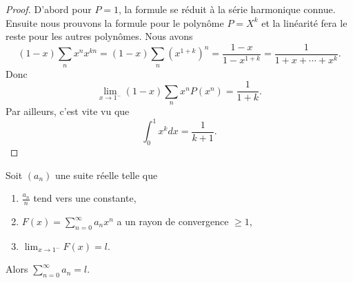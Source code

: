 \begin{proof}
	D'abord pour \( P=1\), la formule se réduit à la série harmonique connue. Ensuite nous prouvons la formule pour le polynôme \( P=X^k\) et la linéarité fera le reste pour les autres polynômes. Nous avons
	\begin{equation}
		(1-x)\sum_nx^nx^{kn}=(1-x)\sum_n(x^{1+k})^n=\frac{ 1-x }{ 1-x^{1+k} }=\frac{1}{ 1+x+\cdots+x^k }.
	\end{equation}
	Donc
	\begin{equation}
		\lim_{x\to 1^-} (1-x)\sum_nx^nP(x^n)=\frac{1}{ 1+k }.
	\end{equation}
	Par ailleurs, c'est vite vu que
	\begin{equation}
		\int_0^1 x^kdx=\frac{1}{ k+1 }.
	\end{equation}
\end{proof}

\begin{theorem}      \label{ThoPdDxgP}
	Soit \( (a_n)\) une suite réelle telle que
	\begin{enumerate}
		\item
		      \( \frac{ a_n }{ n }\) tend vers une constante,
		\item
		      \( F(x)=\sum_{n=0}^{\infty}a_nx^n\) a un rayon de convergence \( \geq 1\),
		\item
		      \( \lim_{x\to 1^-} F(x)=l\).
	\end{enumerate}
	Alors \( \sum_{n=0}^{\infty}a_n=l\).
\end{theorem}

